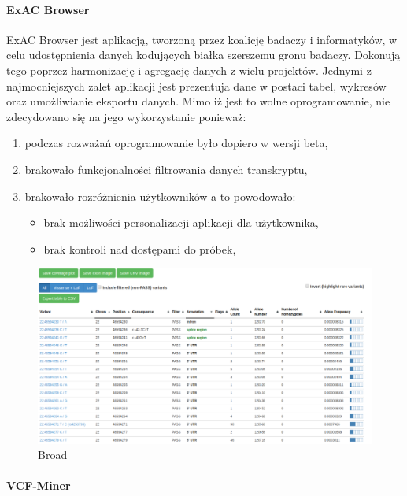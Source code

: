 \documentclass[a4paper,12pt,twoside]{article}
\begin{document}
\paragraph{ExAC Browser} ExAC Browser \cite{exac} \cite{exacCite} jest aplikacją, tworzoną przez koalicję badaczy i informatyków, w celu
udostępnienia danych kodujących białka szerszemu gronu badaczy. 
Dokonują tego poprzez harmonizację i agregację danych z wielu projektów.
Jednymi z najmocniejszych zalet aplikacji jest prezentuja dane w postaci tabel, wykresów oraz umożliwianie eksportu danych.
Mimo iż jest to wolne oprogramowanie, nie zdecydowano się na jego wykorzystanie
ponieważ:
\begin{enumerate}[1)]
\item podczas rozważań oprogramowanie było dopiero w wersji beta, 
\item brakowało funkcjonalności filtrowania danych transkryptu,
\item brakowało rozróżnienia użytkowników a to powodowało:
\begin{itemize}
\item brak możliwości personalizacji aplikacji dla użytkownika,
\item brak kontroli nad dostępami do próbek,
\end{itemize}
\end{enumerate}

\begin{figure}[h]
\includegraphics[width=\linewidth]{obrazy/exac/broad.png}
  \caption{Broad}
  \label{fig:broadpic}
\end{figure}

\newpage

\paragraph{VCF-Miner}
\end{document}
